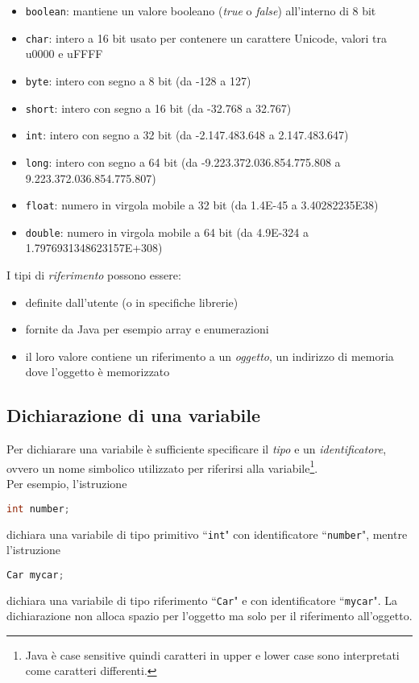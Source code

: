 \documentclass{article}
\begin{document}
	\begin{itemize}
		\item \texttt{boolean}: mantiene un valore booleano (\emph{true} o \emph{false}) all'interno di 8 bit
		\item \texttt{char}: intero a 16 bit usato per contenere un carattere Unicode, valori tra u0000 e uFFFF
		\item \texttt{byte}: intero con segno a 8 bit (da -128 a 127)
		\item \texttt{short}: intero con segno a 16 bit (da -32.768 a 32.767)
		\item \texttt{int}: intero con segno a 32 bit (da -2.147.483.648 a 2.147.483.647)
		\item \texttt{long}: intero con segno a 64 bit (da -9.223.372.036.854.775.808 a 9.223.372.036.854.775.807)
		\item \texttt{float}: numero in virgola mobile a 32 bit (da 1.4E-45 a 3.40282235E38)
		\item \texttt{double}: numero in virgola mobile a 64 bit (da 4.9E-324 a 1.7976931348623157E+308)
	\end{itemize}

I tipi di \emph{riferimento} possono essere:
\begin{itemize}
\item definite dall'utente (o in specifiche librerie)
\item fornite da Java per esempio array e enumerazioni
\item il loro valore contiene un riferimento a un \emph{oggetto}, un indirizzo di memoria dove l'oggetto è memorizzato
\end{itemize}

\subsection{Dichiarazione di una variabile}
Per dichiarare una variabile è sufficiente specificare il \emph{tipo} e un \emph{identificatore}, ovvero un nome simbolico utilizzato per riferirsi alla variabile\footnote{Java è case sensitive quindi caratteri in upper e lower case sono interpretati come caratteri differenti.}. \\
Per esempio, l'istruzione
\begin{lstlisting}[language=Java,escapechar=|]
int number;
\end{lstlisting}
dichiara una variabile di tipo primitivo ``\texttt{int}" con identificatore ``\texttt{number}", mentre l'istruzione
\begin{lstlisting}[language=Java,escapechar=|]
Car mycar;
\end{lstlisting}
dichiara una variabile di tipo riferimento ``\texttt{Car}" e con identificatore ``\texttt{mycar}".
La dichiarazione non alloca spazio per l'oggetto ma solo per il riferimento all'oggetto. \\
\end{document}
